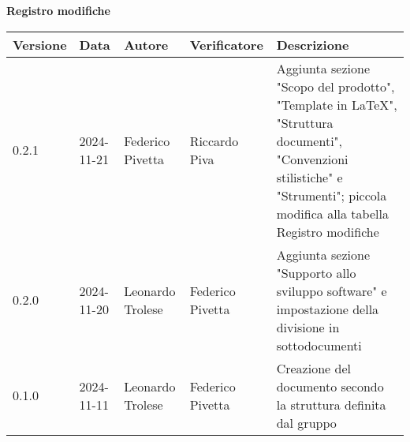 
\begin{center}
\textbf{Registro modifiche}\\
\vspace{2mm}

\begin{tabularx}{\textwidth}{|l|l|l|l|X|}
\hline
\textbf{Versione} & \textbf{Data} & \textbf{Autore} & \textbf{Verificatore} & \textbf{Descrizione}\\
    \hline
     0.2.1 & 2024-11-21  & Federico Pivetta  & Riccardo Piva& Aggiunta sezione "Scopo del prodotto", "Template in LaTeX", "Struttura documenti", "Convenzioni stilistiche" e "Strumenti"; piccola modifica alla tabella Registro modifiche\\
    \hline
    0.2.0 & 2024-11-20  & Leonardo Trolese & Federico Pivetta  & Aggiunta sezione "Supporto allo sviluppo software" e impostazione della divisione in sottodocumenti\\
    \hline
    0.1.0 & 2024-11-11  & Leonardo Trolese & Federico Pivetta  & Creazione del documento secondo la struttura definita dal gruppo\\
    \hline

\end{tabularx}
\end{center}
